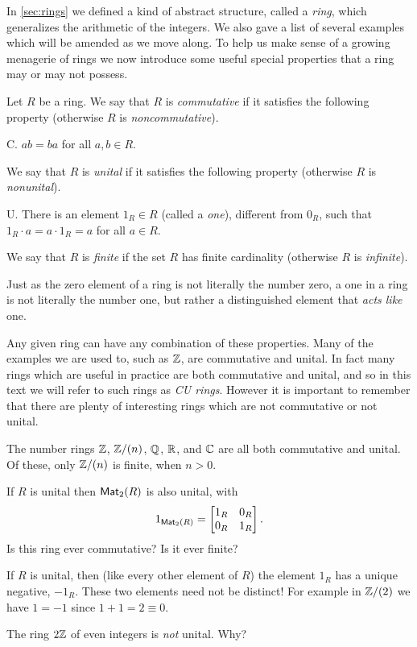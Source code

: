 In \autoref{sec:rings} we defined a kind of abstract structure, called a \emph{ring}, which generalizes the arithmetic of the integers. We also gave a list of several examples which will be amended as we move along. To help us make sense of a growing menagerie of rings we now introduce some useful special properties that a ring may or may not possess.

\begin{dfn} \label{dfn:ring-fams}
Let \(R\) be a ring. We say that \(R\) is \emph{commutative}  if it satisfies the following property (otherwise \(R\) is \emph{noncommutative}).
\begin{proplist}
\item[C.] \(ab = ba\) for all \(a,b \in R\).
\end{proplist}
We say that \(R\) is \emph{unital}  if it satisfies the following property (otherwise \(R\) is \emph{nonunital}).
\begin{proplist}
\item[U.] There is an element \(1_R \in R\) (called a \emph{one}), different from \(0_R\), such that \(1_R \cdot a = a \cdot 1_R = a\) for all \(a \in R\).
\end{proplist}
We say that \(R\) is \emph{finite} if the set \(R\) has finite cardinality (otherwise \(R\) is \emph{infinite}).
\end{dfn}

Just as the zero element of a ring is not literally the number zero, a one in a ring is not literally the number one, but rather a distinguished element that \emph{acts like} one.

Any given ring can have any combination of these properties. Many of the examples we are used to, such as \(\mathbb{Z}\), are commutative and unital. In fact many rings which are useful in practice are both commutative and unital, and so in this text we will refer to such rings as \emph{CU rings}.  However it is important to remember that there are plenty of interesting rings which are not commutative or not unital.

\begin{examples}
\item The number rings \(\mathbb{Z}\), \(\mathbb{Z}/(n)\), \(\mathbb{Q}\), \(\mathbb{R}\), and \(\mathbb{C}\) are all both commutative and unital. Of these, only \(\mathbb{Z}/(n)\) is finite, when \(n > 0\).

\item If \(R\) is unital then \(\mathsf{Mat}_{2}(R)\) is also unital, with \[ 1_{\mathsf{Mat}_{2}(R)} = \begin{bmatrix} 1_R & 0_R \\ 0_R & 1_R \end{bmatrix}. \] Is this ring ever commutative? Is it ever finite?

\item If \(R\) is unital, then (like every other element of $R$) the element \(1_R\) has a unique negative, \(-1_R\). These two elements need not be distinct! For example in \(\mathbb{Z}/(2)\) we have \(1 = -1\) since \(1 + 1 = 2 \equiv 0\).

\item The ring \(2\mathbb{Z}\) of even integers is \emph{not} unital. Why?
\end{examples}

